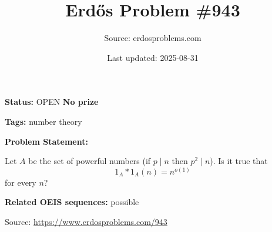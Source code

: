 \documentclass{article}
\title{Erd\H{o}s Problem \#943}
\date{Last updated: 2025-08-31}
\author{Source: erdosproblems.com}
\begin{document}
\maketitle

\noindent\textbf{Status:} OPEN \quad \textbf{No prize}

\noindent\textbf{Tags:} number theory

\medskip

\noindent\textbf{Problem Statement:}

Let $A$ be the set of powerful numbers (if $p\mid n$ then $p^2\mid n$). Is it true that\[1_A\ast 1_A(n)=n^{o(1)}\]for every $n$?

\noindent\textbf{Related OEIS sequences:} possible


\bigskip
\noindent\small{Source: \url{https://www.erdosproblems.com/943}}
\end{document}
